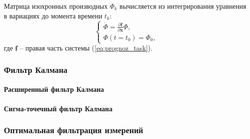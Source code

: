 Матрица изохронных производных $\Phi_k$ вычисляется 
из интегрирования уравнения в вариациях до момента времени $t_k$:
\begin{equation}
    \begin{cases}
        \dot{\Phi} = \frac{\partial \mathbf{f}}{\partial \mathbf{x}} \Phi, \\
        \Phi(t = t_0) = \Phi_0,
        \label{eq:prognoz_phi}
    \end{cases}
\end{equation}
где $\mathbf{f}$ -- правая часть системы (\ref{eq:prognoz_task}).

\subsubsection{Фильтр Калмана}

\paragraph{Расширенный фильтр Калмана}

\paragraph{Сигма-точечный фильтр Калмана}

\subsubsection{Оптимальная фильтрация измерений}